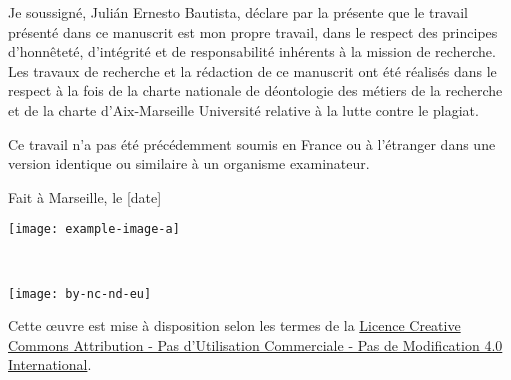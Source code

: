 \iftrue %
    Je soussigné, Julián Ernesto Bautista, %
    déclare par la présente que le travail présenté dans ce manuscrit est mon propre travail, 
    dans le respect des principes d'honnêteté, d'intégrité et de responsabilité inhérents à la mission de recherche. Les travaux de recherche et la 
    rédaction de ce manuscrit ont été réalisés dans le respect à la fois de la charte nationale de déontologie des métiers de la recherche et de la 
    charte d'Aix-Marseille Université relative à la lutte contre le plagiat.
    
    Ce travail n'a pas été précédemment soumis en France ou à l'étranger dans une version identique ou similaire à un organisme examinateur.
    
    Fait à Marseille, le [date]
    
    \begin{flushright}\texttt{[image: example-image-a]}\end{flushright}%
\fi

\iffalse %
    I, undersigned, Julián Ernesto Bautista, %
    hereby declare that the work presented in this manuscript is my own work, %
    in accordance with the principles of honesty, integrity and responsibility inherent to the research mission. The research work and the writing of this manuscript have been carried out in compliance with both the french national charter for Research Integrity and the Aix-Marseille University charter on the fight against plagiarism.
    
    This work has not been submitted previously either in this country or in aother country in the same or in a similar version to any other examination body.
    
    Marseille, [date]
    
    \begin{flushright}\texttt{[image: example-image-b]}\texttt{[image: example-image-a]}\end{flushright} %
\fi

~\vfill
\begin{center}
	\begin{minipage}[c]{0.25\linewidth}
		\texttt{[image: by-nc-nd-eu]}
	\end{minipage}\hfill
\end{center}

Cette \oe{}uvre est mise à disposition selon les termes de la \href{https://creativecommons.org/licenses/by-nc-nd/4.0/deed.fr}{Licence Creative Commons Attribution - Pas d'Utilisation Commerciale - Pas de Modification 4.0 International}. %
